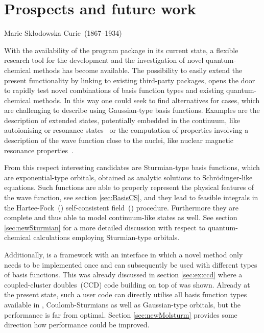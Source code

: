 \chapter{Prospects and future work}
\label{ch:Prospects}
{Marie Skłodowska Curie~(1867--1934)}

\noindent
With the availability of the \molsturm program package in its
current state, a flexible research tool
for the development and the investigation of novel quantum-chemical methods
has become available.
The possibility to easily extend the present functionality
by linking to existing third-party packages,
opens the door to rapidly test novel combinations of basis function types
and existing quantum-chemical methods.
In this way one could seek to find alternatives for cases,
which are challenging to describe using Gaussian-type basis functions.
Examples are the description of extended states,
potentially embedded in the continuum,
like autoionising or resonance states~\cite{Feshbach1958,Feshbach1962,Riss1993,Santra2002}
or the computation of properties involving a description
of the wave function close to the nuclei,
like nuclear magnetic resonance properties~\cite{Guell2008,Hoggan2009}.

From this respect interesting candidates are Sturmian-type basis functions,
which are exponential-type orbitals,
obtained as analytic solutions to Schrödinger-like equations.
Such functions are able to properly represent
the physical features of the wave function,
see section \ref{sec:BasisCS},
and they lead to feasible integrals
in the Hartee-Fock~(\HF) self-consistent field~(\SCF) procedure.
Furthermore they are complete
and thus able to model continuum-like states as well.
See section \ref{sec:newSturmian} for a more
detailed discussion with respect to
quantum-chemical calculations employing Sturmian-type orbitals.

Additionally, \molsturm is a framework with an interface
in which a novel method only needs to be implemented
once and can subsequently be
used with different types of basis functions.
This was already discussed in section \vref{sec:ex:ccd}
where a coupled-cluster doubles~(CCD) code building on top of \molsturm was shown.
Already at the present state, such a user code can
directly utilise all basis function types available in \molsturm,
\ie Coulomb-Sturmians as well as Gaussian-type orbitals,
but the performance is far from optimal.
Section \ref{sec:newMolsturm} provides some direction
how performance could be improved.

